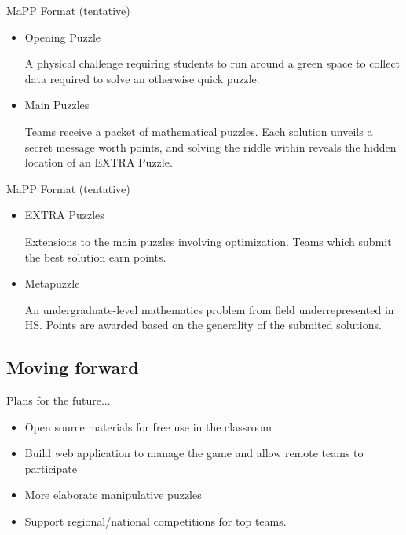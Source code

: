 \documentclass{beamer}
\newcommand{\vpause}{\pause\vspace{1em}}
\begin{document}
\begin{frame}{MaPP Format (tentative)}

  \begin{itemize}
    \item
    Opening Puzzle

    A physical challenge requiring students to run around a green space
    to collect data required to solve an otherwise quick puzzle.

    \vpause

    \item
    Main Puzzles

    Teams receive a packet of mathematical puzzles. Each solution unveils
    a secret message worth points, and solving the riddle within reveals
    the hidden location of an EXTRA Puzzle.

  \end{itemize}
\end{frame}

\begin{frame}{MaPP Format (tentative)}

  \begin{itemize}
    \item
    EXTRA Puzzles

    Extensions to the main puzzles involving optimization.
    Teams which submit the best solution earn points.

    \vpause

    \item
    Metapuzzle

    An undergraduate-level mathematics problem from field underrepresented
    in HS. Points are awarded based on the
    generality of the submited solutions.
  \end{itemize}
\end{frame}

\subsection{Moving forward}

\begin{frame}
  Plans for the future...
  \pause
  \begin{itemize}
    \item Open source materials for free use in the classroom
    \vpause
    \item Build web application to manage the game and allow remote
          teams to participate
    \vpause
    \item More elaborate manipulative puzzles
    \vpause
    \item Support regional/national competitions for top teams.
  \end{itemize}
\end{frame}
\end{document}
